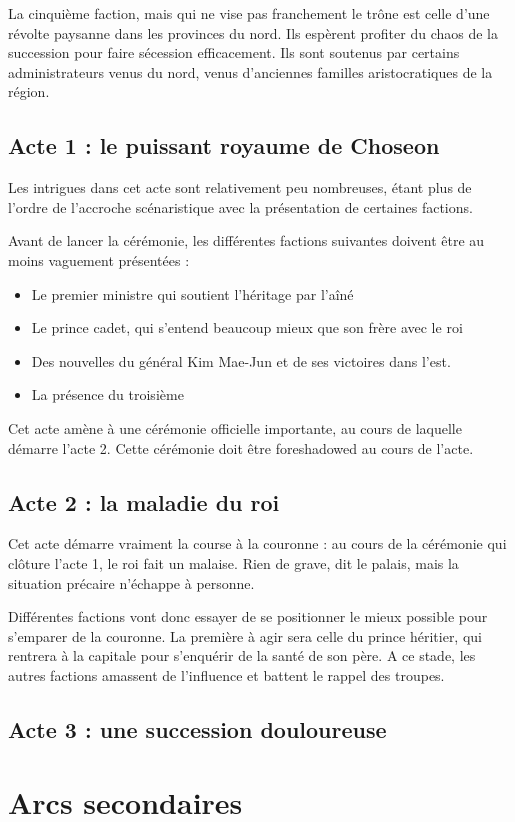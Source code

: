 \documentclass[10pt,a4paper]{book}
\begin{document}
La cinquième faction, mais qui ne vise pas franchement le trône est celle d'une révolte paysanne dans les provinces du nord. Ils espèrent profiter du chaos de la succession pour faire sécession efficacement. Ils sont soutenus par certains administrateurs venus du nord, venus d'anciennes familles aristocratiques de la région.
\subsection{Acte 1 : le puissant royaume de Choseon}
Les intrigues dans cet acte sont relativement peu nombreuses, étant plus de l'ordre de l'accroche scénaristique avec la présentation de certaines factions.

Avant de lancer la cérémonie, les différentes factions suivantes doivent être au moins vaguement présentées :
\begin{itemize}
\item Le premier ministre qui soutient l'héritage par l'aîné
\item Le prince cadet, qui s'entend beaucoup mieux que son frère avec le roi
\item Des nouvelles du général Kim Mae-Jun et de ses victoires dans l'est.
\item La présence du troisième 
\end{itemize}

Cet acte amène à une cérémonie officielle importante, au cours de laquelle démarre l'acte 2. Cette cérémonie doit être foreshadowed au cours de l'acte.
\subsection{Acte 2 : la maladie du roi}
Cet acte démarre vraiment la course à la couronne : au cours de la cérémonie qui clôture l'acte 1, le roi fait un malaise. Rien de grave, dit le palais, mais la situation précaire n'échappe à personne. 

Différentes factions vont donc essayer de se positionner le mieux possible pour s'emparer de la couronne. La première à agir sera celle du prince héritier, qui rentrera à la capitale pour s'enquérir de la santé de son père. A ce stade, les autres factions amassent de l'influence et battent le rappel des troupes.
\subsection{Acte 3 : une succession douloureuse}
\section{Arcs secondaires}
\end{document}
